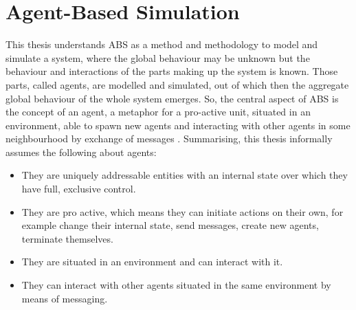 \section{Agent-Based Simulation}
\label{sec:method_abs}


This thesis understands ABS as a method and methodology to model and simulate a system, where the global behaviour may be unknown but the behaviour and interactions of the parts making up the system is known. Those parts, called agents, are modelled and simulated, out of which then the aggregate global behaviour of the whole system emerges. So, the central aspect of ABS is the concept of an agent, a metaphor for a pro-active unit, situated in an environment, able to spawn new agents and interacting with other agents in some neighbourhood by exchange of messages \cite{macal_everything_2016, odell_objects_2002, siebers_introduction_2008, wooldridge_introduction_2009}. Summarising, this thesis informally assumes the following about agents:

\begin{itemize}
	\item They are uniquely addressable entities with an internal state over which they have full, exclusive control.
	\item They are pro active, which means they can initiate actions on their own, for example change their internal state, send messages, create new agents, terminate themselves.
	\item They are situated in an environment and can interact with it.
	\item They can interact with other agents situated in the same environment by means of messaging.
\end{itemize} 

